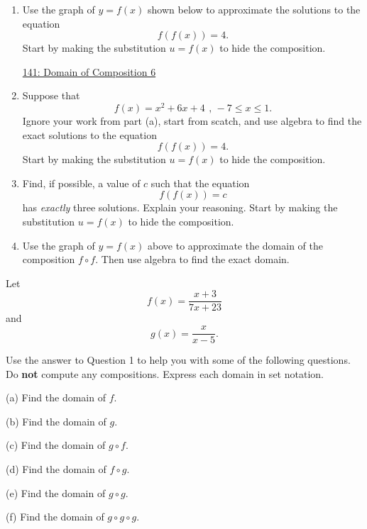 \documentclass{ximera}
\begin{document}
\begin{question} \label{Q32443ggr}
\begin{enumerate}
\item Use the graph of $y=f(x)$ shown below to approximate the solutions to the equation
\[
    f(f(x)) = 4 .
\]
Start by making the substitution $u=f(x)$ to hide the composition.

\begin{onlineOnly}
    \begin{center}
\end{center}
\end{onlineOnly}

\href{https://www.desmos.com/calculator/hbegdhlhbb}{141: Domain of Composition 6}

\item Suppose that 
\[
       f(x) = x^{2}+6x+4\  \, , \, -7\leq x\leq 1  .
\]
Ignore your work from part (a), start from scatch, and use algebra to find the exact solutions to the equation 
\[
    f(f(x)) = 4.
\]
Start by making the substitution $u=f(x)$ to hide the composition.

\item Find, if possible, a value of $c$ such that the equation
\[
    f(f(x))=c
\]
has \emph{exactly} three solutions. Explain your reasoning. Start by making the substitution $u=f(x)$ to hide the composition.

\item Use the graph of $y=f(x)$ above to approximate the domain of the composition $f\circ f$. Then use algebra to find the exact domain.

\end{enumerate}

\end{question}


\begin{example} \label{Ex1:Comp}
Let 
\[
     f(x) = \frac{x+3}{7x+23}
\]
and
\[
    g(x) = \frac{x}{x-5} .
\]

Use the answer to Question 1 to help you with some of the following questions. Do {\bf not} compute any compositions. Express each domain in set notation.
 
(a) Find the domain of $f$.

(b) Find the domain of $g$.

(c) Find the domain of $g\circ f$.

(d) Find the domain of $f\circ g$.

(e) Find the domain of $g\circ g$.

(f) Find the domain of $g\circ g\circ g$.

\end{example}
\end{document}
